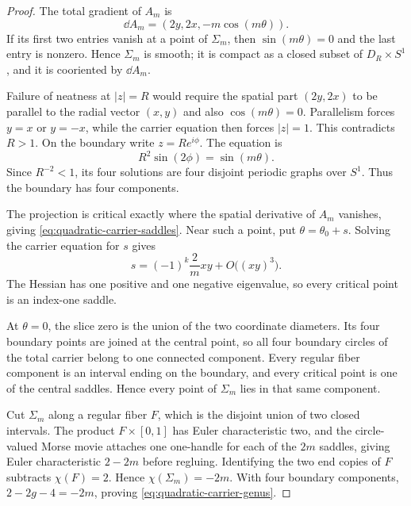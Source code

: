 \begin{proof}
The total gradient of $A_m$ is
\begin{equation}
 \dd A_m=(2y,2x,-m\cos(m\theta)).
 \label{eq:quadratic-carrier-total-gradient}
\end{equation}
If its first two entries vanish at a point of $\Sigma_m$, then
$\sin(m\theta)=0$ and the last entry is nonzero.  Hence $\Sigma_m$ is smooth;
it is compact as a closed subset of $D_R\times S^1$, and it is cooriented by
$\dd A_m$.

Failure of neatness at $|z|=R$ would require the spatial part
$(2y,2x)$ to be parallel to the radial vector $(x,y)$ and also
$\cos(m\theta)=0$.  Parallelism forces $y=x$ or $y=-x$, while the carrier
equation then forces $|z|=1$.  This contradicts $R>1$.  On the boundary write
$z=Re^{i\phi}$.  The equation is
\begin{equation}
 R^2\sin(2\phi)=\sin(m\theta).
 \label{eq:quadratic-carrier-boundary-equation}
\end{equation}
Since $R^{-2}<1$, its four solutions are four disjoint periodic graphs over
$S^1$.  Thus the boundary has four components.

The projection is critical exactly where the spatial derivative of $A_m$
vanishes, giving \eqref{eq:quadratic-carrier-saddles}.  Near such a point, put
$\theta=\theta_0+s$.  Solving the carrier equation for $s$ gives
\begin{equation}
 s=(-1)^k\frac{2}{m}xy+O\bigl((xy)^3\bigr).
 \label{eq:quadratic-carrier-saddle-normal-form}
\end{equation}
The Hessian has one positive and one negative eigenvalue, so every critical
point is an index-one saddle.

At $\theta=0$, the slice zero is the union of the two coordinate diameters.
Its four boundary points are joined at the central point, so all four boundary
circles of the total carrier belong to one connected component.  Every regular
fiber component is an interval ending on the boundary, and every critical point
is one of the central saddles.  Hence every point of $\Sigma_m$ lies in that
same component.

Cut $\Sigma_m$ along a regular fiber $F$, which is the disjoint union of two
closed intervals.  The product $F\times[0,1]$ has Euler characteristic two, and
the circle-valued Morse movie attaches one one-handle for each of the $2m$
saddles, giving Euler characteristic $2-2m$ before regluing.  Identifying the
two end copies of $F$ subtracts $\chi(F)=2$.  Hence
$\chi(\Sigma_m)=-2m$.  With four boundary components,
$2-2g-4=-2m$, proving \eqref{eq:quadratic-carrier-genus}.


\end{proof}

